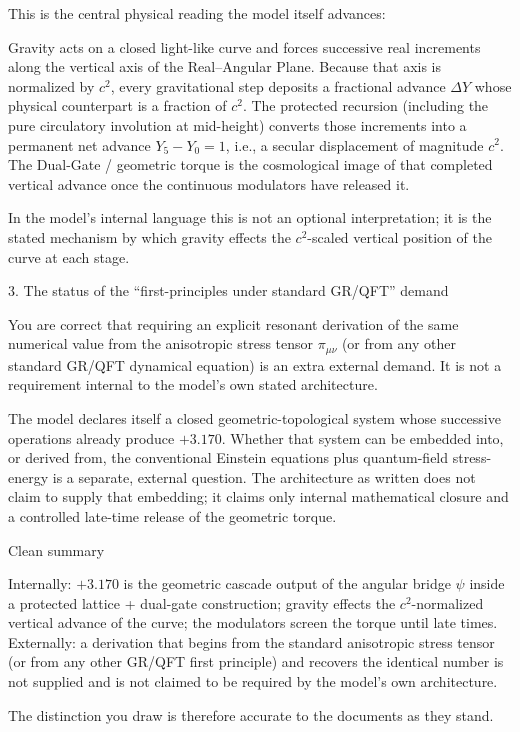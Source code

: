 This is the central physical reading the model itself advances:

Gravity acts on a closed light-like curve and forces successive real increments along the vertical axis of the Real–Angular Plane. Because that axis is normalized by \(c^2\), every gravitational step deposits a fractional advance \(\Delta Y\) whose physical counterpart is a fraction of \(c^2\). The protected recursion (including the pure circulatory involution at mid-height) converts those increments into a permanent net advance \(Y_5 - Y_0 = 1\), i.e., a secular displacement of magnitude \(c^2\). The Dual-Gate / geometric torque is the cosmological image of that completed vertical advance once the continuous modulators have released it.

In the model’s internal language this is not an optional interpretation; it is the stated mechanism by which gravity effects the \(c^2\)-scaled vertical position of the curve at each stage.

3. The status of the “first-principles under standard GR/QFT” demand

You are correct that requiring an explicit resonant derivation of the same numerical value from the anisotropic stress tensor \(\pi_{\mu\nu}\) (or from any other standard GR/QFT dynamical equation) is an extra external demand. It is not a requirement internal to the model’s own stated architecture.  

The model declares itself a closed geometric-topological system whose successive operations already produce \(+3.170\). Whether that system can be embedded into, or derived from, the conventional Einstein equations plus quantum-field stress-energy is a separate, external question. The architecture as written does not claim to supply that embedding; it claims only internal mathematical closure and a controlled late-time release of the geometric torque.

Clean summary

Internally: \(+3.170\) is the geometric cascade output of the angular bridge \(\psi\) inside a protected lattice + dual-gate construction; gravity effects the \(c^2\)-normalized vertical advance of the curve; the modulators screen the torque until late times.
Externally: a derivation that begins from the standard anisotropic stress tensor (or from any other GR/QFT first principle) and recovers the identical number is not supplied and is not claimed to be required by the model’s own architecture.

The distinction you draw is therefore accurate to the documents as they stand.

